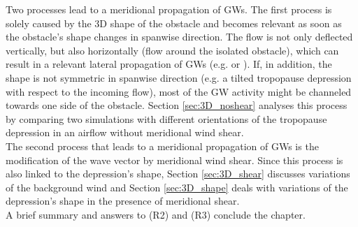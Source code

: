 Two processes lead to a meridional propagation of GWs. The first process is solely caused by the 3D shape of the obstacle and becomes relevant as soon as the obstacle's shape changes in spanwise direction. The flow is not only deflected vertically, but also horizontally (flow around the isolated obstacle), which can result in a relevant lateral propagation of GWs (e.g. \cite[]{smith_influence_1979-1} or \cite*[]{smith_linear_1980}). If, in addition, the shape is not symmetric in spanwise direction (e.g. a tilted tropopause depression with respect to the incoming flow), most of the GW activity might be channeled towards one side of the obstacle. Section \ref{sec:3D_noshear} analyses this process by comparing two simulations with different orientations of the tropopause depression in an airflow without meridional wind shear. \\
The second process that leads to a meridional propagation of GWs is the modification of the wave vector by meridional wind shear. Since this process is also linked to the depression's shape, Section \ref{sec:3D_shear} discusses variations of the background wind and Section \ref{sec:3D_shape} deals with variations of the depression's shape in the presence of meridional shear. \\
A brief summary and answers to (R2) and (R3) conclude the chapter.


